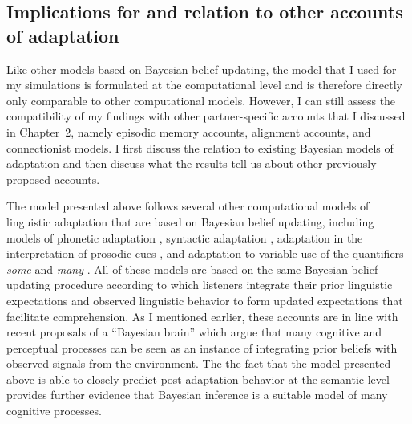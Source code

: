\subsection{Implications for and relation to other accounts of adaptation}










Like other models based on Bayesian belief updating, the model that I used for my simulations
is formulated at the computational level \cite{Marr1982,Anderson1990} 
and is therefore directly only comparable to other computational models. However, I can still assess 
the compatibility of my findings with other partner-specific accounts that I discussed in Chapter~2, namely
episodic memory accounts, alignment accounts, and connectionist models. I first discuss the relation to existing Bayesian
 models of adaptation and then discuss what the results tell us about other previously proposed accounts. 
 
The model presented above follows several other computational models of linguistic adaptation that are based 
on Bayesian belief updating, including models of phonetic adaptation \cite{Kleinschmidt2015}, syntactic 
adaptation \cite{Kleinschmidt2012}, adaptation in the interpretation of prosodic cues \cite{Roettger2019},
and adaptation to variable use of the quantifiers \textit{some} and \textit{many} \cite{Qing2014}. 
All of these models are based on the same Bayesian belief updating procedure according to which listeners integrate
their prior linguistic expectations and observed linguistic behavior to form updated expectations that facilitate comprehension.
As I mentioned earlier, these accounts are in line with recent proposals of a ``Bayesian brain'' \parencite[e.g.,][]{Clark2013,Friston2010} which argue that
many cognitive and perceptual processes can be seen as an instance of integrating prior beliefs with observed signals from the environment. The 
the fact that the model presented above is able to closely predict post-adaptation behavior at the semantic level provides further evidence 
that Bayesian inference is a suitable model of many cognitive processes.

